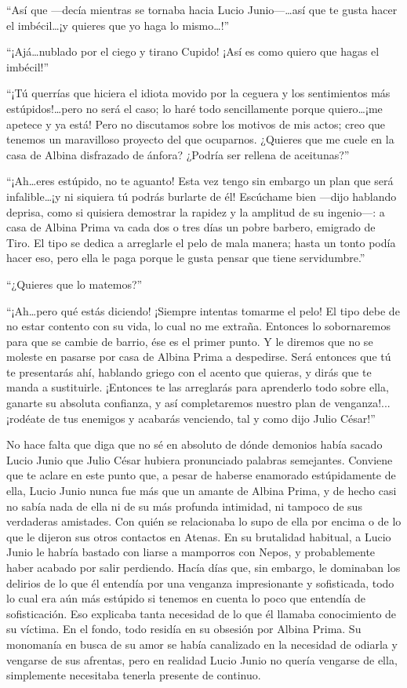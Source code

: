 \documentclass[11pt,openany]{book}
\begin{document}
“Así que —decía mientras se tornaba hacia Lucio Junio—\dots así que te gusta hacer el imbécil\dots ¡y quieres que yo haga lo mismo\dots!” 


“¡Ajá\dots nublado por el ciego y tirano Cupido! ¡Así es como quiero que hagas el imbécil!” 

“¡Tú querrías que hiciera el idiota movido por la ceguera y los sentimientos más estúpidos!\dots pero no será el caso; lo haré todo sencillamente porque quiero\dots ¡me apetece y ya está! Pero no discutamos sobre los motivos de mis actos; creo que tenemos un maravilloso proyecto del que ocuparnos. ¿Quieres que me cuele en la casa de Albina disfrazado de ánfora? ¿Podría ser rellena de aceitunas?” 

“¡Ah\dots eres estúpido, no te aguanto! Esta vez tengo sin embargo un plan que será infalible\dots  ¡y ni siquiera tú podrás burlarte de él! Escúchame bien —dijo hablando deprisa, como si quisiera demostrar la rapidez y la amplitud de su ingenio—: a casa de Albina Prima va cada dos o tres días un pobre barbero, emigrado de Tiro. El tipo se dedica a arreglarle el pelo de mala manera; hasta un tonto podía hacer eso, pero ella le paga porque le gusta pensar que tiene servidumbre.” 

“¿Quieres que lo matemos?” 

“¡Ah\dots pero qué estás diciendo! ¡Siempre intentas tomarme el pelo! El tipo debe de no estar contento con su vida, lo cual no me extraña. Entonces lo sobornaremos para que se cambie de barrio, ése es el primer punto. Y le diremos que no se moleste en pasarse por casa de Albina Prima a despedirse. Será entonces que tú te presentarás ahí, hablando griego con el acento que quieras, y dirás que te manda a sustituirle. ¡Entonces te las arreglarás para aprenderlo todo sobre ella, ganarte su absoluta confianza, y así completaremos nuestro plan de venganza!... ¡rodéate de tus enemigos y acabarás venciendo, tal y como dijo Julio César!” 

No hace falta que diga que no sé en absoluto de dónde demonios había sacado Lucio Junio que Julio César hubiera pronunciado palabras semejantes. Conviene que te aclare en este punto que, a pesar de haberse enamorado estúpidamente de ella, Lucio Junio nunca fue más que un amante de Albina Prima, y de hecho casi no sabía nada de ella ni de su más profunda intimidad, ni tampoco de sus verdaderas amistades. Con quién se relacionaba lo supo de ella por encima o de lo que le dijeron sus otros contactos en Atenas. En su brutalidad habitual, a Lucio Junio le habría bastado con liarse a mamporros con Nepos, y probablemente haber acabado por salir perdiendo. Hacía días que, sin embargo, le dominaban los delirios de lo que él entendía por una venganza impresionante y sofisticada, todo lo cual era aún más estúpido si tenemos en cuenta lo poco que entendía de sofisticación. Eso explicaba tanta necesidad de lo que él llamaba conocimiento de su víctima. En el fondo, todo residía en su obsesión por Albina Prima. Su monomanía en busca de su amor se había canalizado en la necesidad de odiarla y vengarse de sus afrentas, pero en realidad Lucio Junio no quería vengarse de ella, simplemente necesitaba tenerla presente de continuo. 
\end{document}
